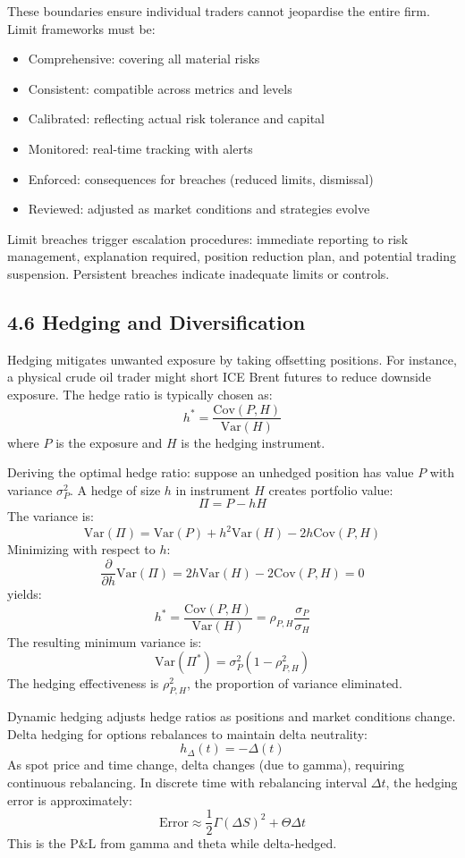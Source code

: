 \documentclass[11pt,a4paper]{article}
\begin{document}
These boundaries ensure individual traders cannot jeopardise the entire firm. Limit frameworks must be:
\begin{itemize}
    \item Comprehensive: covering all material risks
    \item Consistent: compatible across metrics and levels
    \item Calibrated: reflecting actual risk tolerance and capital
    \item Monitored: real-time tracking with alerts
    \item Enforced: consequences for breaches (reduced limits, dismissal)
    \item Reviewed: adjusted as market conditions and strategies evolve
\end{itemize}

Limit breaches trigger escalation procedures: immediate reporting to risk management, explanation required, position reduction plan, and potential trading suspension. Persistent breaches indicate inadequate limits or controls.

\subsection*{4.6 Hedging and Diversification}

Hedging mitigates unwanted exposure by taking offsetting positions. For instance, a physical crude oil trader might short ICE Brent futures to reduce downside exposure. The hedge ratio is typically chosen as:
\[
h^* = \frac{\text{Cov}(P, H)}{\text{Var}(H)}
\]
where $P$ is the exposure and $H$ is the hedging instrument.

Deriving the optimal hedge ratio: suppose an unhedged position has value $P$ with variance $\sigma_P^2$. A hedge of size $h$ in instrument $H$ creates portfolio value:
\[
\Pi = P - hH
\]
The variance is:
\[
\text{Var}(\Pi) = \text{Var}(P) + h^2\text{Var}(H) - 2h\text{Cov}(P,H)
\]
Minimizing with respect to $h$:
\[
\frac{\partial}{\partial h}\text{Var}(\Pi) = 2h\text{Var}(H) - 2\text{Cov}(P,H) = 0
\]
yields:
\[
h^* = \frac{\text{Cov}(P,H)}{\text{Var}(H)} = \rho_{P,H}\frac{\sigma_P}{\sigma_H}
\]
The resulting minimum variance is:
\[
\text{Var}(\Pi^*) = \sigma_P^2(1 - \rho_{P,H}^2)
\]
The hedging effectiveness is $\rho_{P,H}^2$, the proportion of variance eliminated.

Dynamic hedging adjusts hedge ratios as positions and market conditions change. Delta hedging for options rebalances to maintain delta neutrality:
\[
h_{\Delta}(t) = -\Delta(t)
\]
As spot price and time change, delta changes (due to gamma), requiring continuous rebalancing. In discrete time with rebalancing interval $\Delta t$, the hedging error is approximately:
\[
\text{Error} \approx \frac{1}{2}\Gamma(\Delta S)^2 + \Theta \Delta t
\]
This is the P\&L from gamma and theta while delta-hedged.
\end{document}
